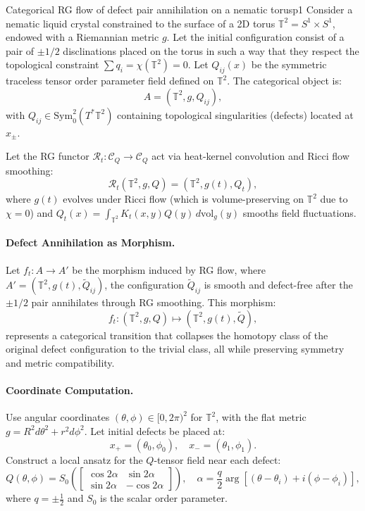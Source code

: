 	\begin{example}{Categorical RG flow of defect pair annihilation on a nematic torus}{p1}
	Consider a nematic liquid crystal constrained to the surface of a 2D torus \( \mathbb{T}^2 = S^1 \times S^1 \), endowed with a Riemannian metric \( g \). Let the initial configuration consist of a pair of \( \pm 1/2 \) disclinations placed on the torus in such a way that they respect the topological constraint \( \sum q_i = \chi(\mathbb{T}^2) = 0 \). Let \( Q_{ij}(x) \) be the symmetric traceless tensor order parameter field defined on \( \mathbb{T}^2 \). The categorical object is:
	\[
	A = (\mathbb{T}^2, g, Q_{ij}),
	\]
	with \( Q_{ij} \in \mathrm{Sym}^2_0(T^*\mathbb{T}^2) \) containing topological singularities (defects) located at \( x_{\pm} \).
	
	Let the RG functor \( \mathcal{R}_t: \mathcal{C}_Q \to \mathcal{C}_Q \) act via heat-kernel convolution and Ricci flow smoothing:
	\[
	\mathcal{R}_t(\mathbb{T}^2, g, Q) = (\mathbb{T}^2, g(t), Q_t),
	\]
	where \( g(t) \) evolves under Ricci flow (which is volume-preserving on \( \mathbb{T}^2 \) due to \( \chi = 0 \)) and \( Q_t(x) = \int_{\mathbb{T}^2} K_t(x,y) Q(y) \, d\mathrm{vol}_g(y) \) smooths field fluctuations.
	
	\paragraph{Defect Annihilation as Morphism.}  
	Let \( f_t: A \to A' \) be the morphism induced by RG flow, where \( A' = (\mathbb{T}^2, g(t), \widetilde{Q}_{ij}) \), the configuration \( \widetilde{Q}_{ij} \) is smooth and defect-free after the \( \pm 1/2 \) pair annihilates through RG smoothing. This morphism:
	\[
	f_t: (\mathbb{T}^2, g, Q) \mapsto (\mathbb{T}^2, g(t), \widetilde{Q}),
	\]
	represents a categorical transition that collapses the homotopy class of the original defect configuration to the trivial class, all while preserving symmetry and metric compatibility.
	
	\paragraph{Coordinate Computation.}
	Use angular coordinates \( (\theta, \phi) \in [0,2\pi)^2 \) for \( \mathbb{T}^2 \), with the flat metric \( g = R^2 d\theta^2 + r^2 d\phi^2 \). Let initial defects be placed at:
	\[
	x_{+} = (\theta_0, \phi_0), \quad x_{-} = (\theta_1, \phi_1).
	\]
	Construct a local ansatz for the \( Q \)-tensor field near each defect:
	\[
	Q(\theta, \phi) = S_0 \left(
	\begin{bmatrix}
		\cos 2\alpha & \sin 2\alpha \\
		\sin 2\alpha & -\cos 2\alpha
	\end{bmatrix}
	\right), \quad \alpha = \frac{q}{2} \arg[(\theta - \theta_i) + i(\phi - \phi_i)],
	\]
	where \( q = \pm \frac{1}{2} \) and \( S_0 \) is the scalar order parameter.
	

\end{example}
